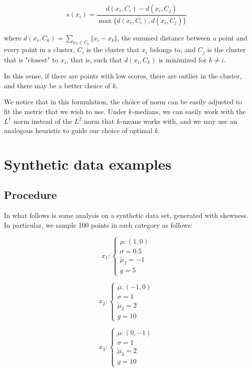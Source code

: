 \documentclass[sn-mathphys,Numbered]{sn-jnl}
\begin{document}
$$s(x_i) =  \frac{d(x_i, C_i) - d(x_i, C_j)}{\max\{ d(x_i, C_i) , d(x_i, C_j)\}}$$

where $d(x_i, C_k) = \sum_{x_k \in C_k} \Vert x_i  - x_k \Vert$, the summed distance between a point and every point in a cluster, $C_i$ is the cluster that $x_i$ belongs to, and $C_j$ is the cluster that is "closest" to $x_i$, that is, such that $d(x_i,C_k)$ is minimized for $k \not = i$.

In this sense, if there are points with low scores, there are outlier in the cluster, and there may be a better choice of $k$.

We notice that in this formulation, the choice of norm can be easily adjusted to fit the metric that we wish to use. Under $k$-medians, we can easily work with the $L^1$ norm instead of the $L^2$ norm that $k$-means works with, and we may use an analogous heuristic to guide our choice of optimal $k$.

\section{Synthetic data examples}

\subsection{Procedure}

In what follows is some analysis on a synthetic data set, generated with skewness. In particular, we sample 100 points in each category as follows:

$$ x_1: \begin{cases} \mu: (1,0) \\ \sigma = 0.5 \\ \tilde{\mu}_3 = -1 \\ g = 5 \end{cases} $$

$$ x_2: \begin{cases} \mu: (-1,0) \\ \sigma = 1 \\ \tilde{\mu}_3 = 2 \\ g = 10 \end{cases} $$

$$ x_3: \begin{cases} \mu: (0,-1) \\ \sigma = 1 \\ \tilde{\mu}_3 = 2 \\ g = 10 \end{cases} $$
\end{document}
